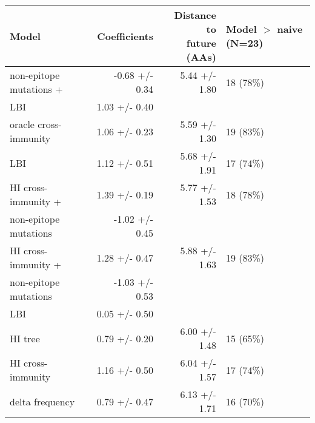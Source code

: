 \begin{tabular*}{0.85\textwidth}{lrrl}
\toprule
                             Model &    Coefficients & \makecell{Distance to \\ future (AAs)} & \makecell[l]{Model $>$ naive \\ (N=23)} \\
\midrule
           non-epitope mutations + &  -0.68 +/- 0.34 &                          5.44 +/- 1.80 &                               18 (78\%) \\
                   \hspace{3mm}LBI &   1.03 +/- 0.40 &                                        &                                         \\
             oracle cross-immunity &   1.06 +/- 0.23 &                          5.59 +/- 1.30 &                               19 (83\%) \\
                               LBI &   1.12 +/- 0.51 &                          5.68 +/- 1.91 &                               17 (74\%) \\
               HI cross-immunity + &   1.39 +/- 0.19 &                          5.77 +/- 1.53 &                               18 (78\%) \\
 \hspace{3mm}non-epitope mutations &  -1.02 +/- 0.45 &                                        &                                         \\
               HI cross-immunity + &   1.28 +/- 0.47 &                          5.88 +/- 1.63 &                               19 (83\%) \\
 \hspace{3mm}non-epitope mutations &  -1.03 +/- 0.53 &                                        &                                         \\
                   \hspace{3mm}LBI &   0.05 +/- 0.50 &                                        &                                         \\
                           HI tree &   0.79 +/- 0.20 &                          6.00 +/- 1.48 &                               15 (65\%) \\
                 HI cross-immunity &   1.16 +/- 0.50 &                          6.04 +/- 1.57 &                               17 (74\%) \\
                   delta frequency &   0.79 +/- 0.47 &                          6.13 +/- 1.71 &                               16 (70\%) \\

\end{tabular*}
